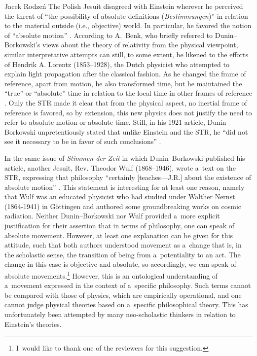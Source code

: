 \begin{artengenv}{Jacek Rodzeń}
The Polish Jesuit disagreed with Einstein wherever he perceived the threat of ``the possibility of absolute definitions (\textit{Bestimmungen})''
\parencite[][p.214]{dunin-borkowski_neue_1921} %
 in relation to the material outside (i.e., objective) world. In particular, he favored the notion of ``absolute motion'' 
\parencite*[][p.213]{dunin-borkowski_neue_1921}. %
 According to A.~Benk, who briefly referred to Dunin–Borkowski's views about the theory of relativity from the physical viewpoint, similar interpretative attempts can still, to some extent, be likened to the efforts of Hendrik A. Lorentz (1853–1928), the Dutch physicist who attempted to explain light propagation after the classical fashion. As he changed the frame of reference, apart from motion, he also transformed time, but he maintained the ``true'' or ``absolute'' time in relation to the local time in other frames of reference 
\parencites[][p.123]{benk_moderne_2000}[cf. also][p.440]{wroblewski_historia_2006}. %
 Only the STR made it clear that from the physical aspect, no inertial frame of reference is favored, so by extension, this new physics does not justify the need to refer to absolute motion or absolute time. Still, in his 1921 article, Dunin–Borkowski unpretentiously stated that unlike Einstein and the STR, he ``did not see it necessary to be in favor of such conclusions'' 
\parencite[][p.214]{dunin-borkowski_neue_1921}.%


In the same issue of \textit{Stimmen der Zeit} in which Dunin–Borkowski published his article, another Jesuit, Rev. Theodor Wulf (1868–1946), wrote a~text on the STR, expressing that philosophy ``certainly [teaches---J.R.] about the existence of absolute motion''
\parencite[][p.115]{wulf_pu1}. %
 This statement is interesting for at least one reason, namely that Wulf was an educated physicist who had studied under Walther Nernst (1864-1941) in Göttingen and authored some groundbreaking works on cosmic radiation. Neither Dunin–Borkowski nor Wulf provided a~more explicit justification for their assertion that in terms of philosophy, one can speak of absolute movement. However, at least one explanation can be given for this attitude, such that both authors understood movement as a~change that is, in the scholastic sense, the transition of being from a~potentiality to an act. The change in this case is objective and absolute, so accordingly, we can speak of absolute movements.\footnote{I~would like to thank one of the reviewers for this suggestion.} However, this is an ontological understanding of a~movement expressed in the context of a~specific philosophy. Such terms cannot be compared with those of physics, which are empirically operational, and one cannot judge physical theories based on a~specific philosophical theory. This has unfortunately been attempted by many neo-scholastic thinkers in relation to Einstein's theories.


\end{artengenv}
